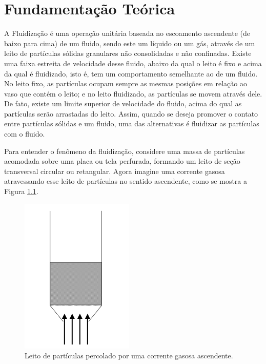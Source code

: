 \chapter{Fundamentação Teórica}

A Fluidização é uma operação unitária baseada no escoamento ascendente (de baixo para cima) de um fluido, sendo este um líquido ou um gás, através de um leito de partículas sólidas granulares não consolidadas e não confinadas. Existe uma faixa estreita de velocidade desse fluido, abaixo da qual o leito é fixo e acima da qual é fluidizado, isto é, tem um comportamento semelhante ao de um fluido. No leito fixo, as partículas ocupam sempre as mesmas posições em relação ao vaso que contém o leito; e no leito fluidizado, as partículas se movem através dele. De fato, existe um limite superior de velocidade do fluido, acima do qual as partículas serão arrastadas do leito. Assim, quando se deseja promover o contato entre partículas sólidas e um fluido, uma das alternativas é fluidizar as partículas com o fluido.


Para entender o fenômeno da fluidização, considere uma massa de partículas acomodada sobre uma placa ou tela perfurada, formando um leito de seção transversal circular ou retangular. Agora imagine uma corrente gasosa atravessando esse leito de partículas no sentido ascendente, como se mostra a Figura \ref{fig1}.


\begin{figure}[H]
	\begin{center}
		\includegraphics[scale=.8, trim={0 0 0 0}]{figuras/ladeq/fluid/fig1}
		\caption{Leito de partículas percolado por uma corrente gasosa ascendente.}
		\label{fig1}
	\end{center}
\end{figure}


